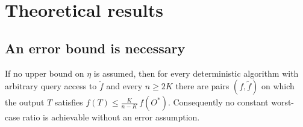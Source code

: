 
\section{Theoretical results}\label{sec:results}

\subsection{An error bound is necessary}\label{sec:necessity}

\begin{proposition}\label{prop:necessity}
If no upper bound on $\eta$ is assumed, then for every deterministic
algorithm with
arbitrary query access to $\tilde f$ and every $n\ge2K$ there are pairs
$(f,\tilde f)$ on which the output $T$ satisfies
$f(T)\le\tfrac{K}{n-K}\,f(O^{\ast})$.  Consequently no constant worst-case
ratio is achievable without an error assumption.
\end{proposition}

